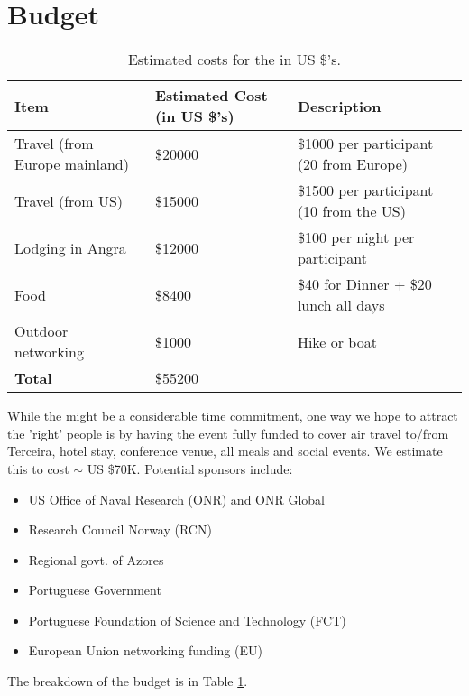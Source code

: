 \section{Budget}
\label{sec:budget}

\begin{table}[!]
  \footnotesize{
    \centering
    \label{tab:budget}
  \begin{tabular}{|p{4cm}|p{3cm}|p{7cm}|}
    \hline 
    \rowcolor{Gray}
    \bfseries Item& \bfseries Estimated Cost (in US \$'s)&\bfseries Description\\
    \hline
    Travel (from Europe mainland)& \$20000 & \$1000 per participant (20 from Europe) \\
    \hline
    Travel (from US)& \$15000 & \$1500 per participant (10 from the US) \\
    \hline
    Lodging in Angra & \$12000 & \$100 per night per participant \\
    \hline
    Food& \$8400 & \$40 for Dinner + \$20 lunch all days\\
    \hline
    Outdoor networking& \$1000 & Hike or boat\\
    \hline
    \textbf{Total}& \$55200 &\\
    \hline        
  \end{tabular}
  \caption{Estimated costs for the \symp in US \$'s.}
}
\end{table}

While the \symp might be a considerable time commitment, one way we
hope to attract the 'right' people is by having the event fully funded
to cover air travel to/from Terceira, hotel stay, conference venue,
all meals and social events. We estimate this to cost $\sim$
US \$70K. Potential sponsors include:

\begin{itemize}[noitemsep,topsep=0pt,parsep=0pt,partopsep=0pt]

  \item US Office of Naval Research (ONR) and ONR Global
  \item Research Council Norway (RCN)
  \item Regional govt. of Azores
  \item Portuguese Government
  \item Portuguese Foundation of Science and Technology (FCT)
  \item European Union networking funding (EU)

\end{itemize}

The breakdown of the budget is in Table \ref{tab:budget}.
